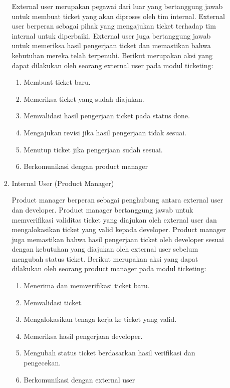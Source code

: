 \documentclass[12pt]{article}
\begin{document}
\begin{enumerate}[label=\textbf{4.\arabic*.}]
\begin{enumerate}[label=\textbf{4.1.\arabic*.}]
\begin{enumerate}[label=\arabic*.]
            External user merupakan pegawai dari luar yang bertanggung jawab untuk membuat ticket yang akan diproses oleh tim internal. External user berperan sebagai pihak yang mengajukan ticket terhadap tim internal untuk diperbaiki. External user juga bertanggung jawab untuk memeriksa hasil pengerjaan ticket dan memastikan bahwa kebutuhan mereka telah terpenuhi. Berikut merupakan aksi yang dapat dilakukan oleh seorang external user pada modul ticketing:
            \begin{enumerate}
                \item Membuat ticket baru.
                \item Memeriksa ticket yang sudah diajukan.
                \item Memvalidasi hasil pengerjaan ticket pada status done.
                \item Mengajukan revisi jika hasil pengerjaan tidak sesuai.
                \item Menutup ticket jika pengerjaan sudah sesuai.
                \item Berkomunikasi dengan product manager
            \end{enumerate}

            \item Internal User (Product Manager)
            
            Product manager berperan sebagai penghubung antara external user dan developer. Product manager bertanggung jawab untuk memverifikasi validitas ticket yang diajukan oleh external user dan mengalokasikan ticket yang valid kepada developer. Product manager juga memastikan bahwa hasil pengerjaan ticket oleh developer sesuai dengan kebutuhan yang diajukan oleh external user sebelum mengubah status ticket. Berikut merupakan aksi yang dapat dilakukan oleh seorang product manager pada modul ticketing:

            \begin{enumerate}
                \item Menerima dan memverifikasi ticket baru.
                \item Memvalidasi ticket.
                \item Mengalokasikan tenaga kerja ke ticket yang valid.
                \item Memeriksa hasil pengerjaan developer.
                \item Mengubah status ticket berdasarkan hasil verifikasi dan pengecekan.
                \item Berkomunikasi dengan external user
            \end{enumerate}


\end{enumerate}
\end{enumerate}
\end{enumerate}
\end{document}
